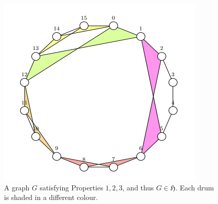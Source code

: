 \documentclass[11pt]{article}
\begin{document}
\begin{figure}[h]
    \centering
    \includegraphics{images/drums.png}
    \caption{A graph $G$ satisfying Properties $1,2,3$, and thus $G \in \mathfrak{H}$. Each drum is shaded in a different colour.}
    \label{fig:Figure-1}
\end{figure}\medskip\\
\end{document}
